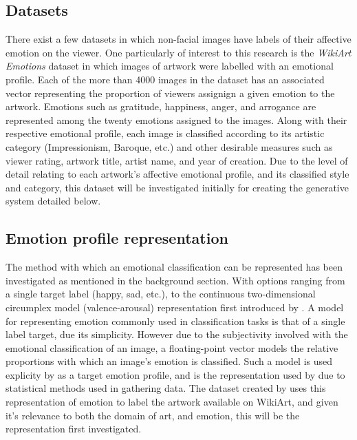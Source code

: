 \documentclass{article}
\begin{document}
\subsection{Datasets}
There exist a few datasets in which non-facial images have labels of their affective emotion on the viewer.
One particularly of interest to this research is the \textit{WikiArt Emotions} dataset \citep{mohammad2018wikiart} in which images of artwork were labelled with an emotional profile.
Each of the more than 4000 images in the dataset has an associated vector representing the proportion of viewers assignign a given emotion to the artwork.
Emotions such as gratitude, happiness, anger, and arrogance are represented among the twenty emotions assigned to the images.
Along with their respective emotional profile, each image is classified according to its artistic category (Impressionism, Baroque, etc.) and other desirable measures such as viewer rating, artwork title, artist name, and year of creation.
Due to the level of detail relating to each artwork's affective emotional profile, and its classified style and category, this dataset will be investigated initially for creating the generative system detailed below.

\subsection{Emotion profile representation}
The method with which an emotional classification can be represented has been investigated as mentioned in the background section.
With options ranging from a single target label (happy, sad, etc.), to the continuous two-dimensional circumplex model (valence-arousal) representation first introduced by \citet{russell1980circumplex}.
A model for representing emotion commonly used in classification tasks is that of a single label target, due its simplicity.
However due to the subjectivity involved with the emotional classification of an image, a floating-point vector models the relative proportions with which an image's emotion is classified.
Such a model is used explicity by \citet{ali2017emotional} as a target emotion profile, and is the representation used by \citep{mohammad2018wikiart} due to statistical methods used in gathering data.
The dataset created by \citet{mohammad2018wikiart} uses this representation of emotion to label the artwork available on WikiArt, and given it's relevance to both the domain of art, and emotion, this will be the representation first investigated.
\end{document}
